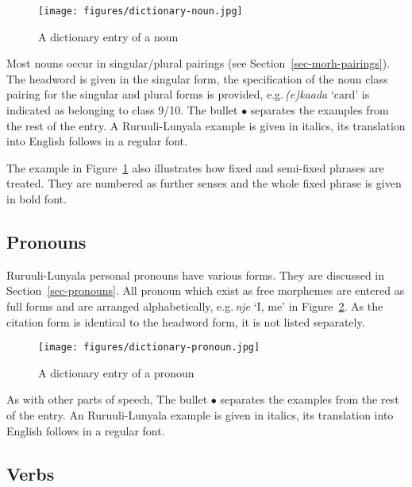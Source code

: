 \begin{figure}[htb]
\begin{center}
 \texttt{[image: figures/dictionary-noun.jpg]}
\caption{A dictionary entry of a noun}\label{fig-nouns}
\end{center}
\end{figure}

\noindent Most nouns occur in singular/plural pairings (see Section~\ref{sec-morh-pairings}). 
The headword is given in the singular form, the specification of the noun class pairing for the singular and plural forms is provided, e.g.\,\emph{(e)kaada} `card' is indicated as belonging to class 9/10. 
The bullet $\bullet$ separates the examples from the rest of the entry. 
A Ru\-ruu\-li\hyp{}Lu\-nya\-la example is given in italics, its translation into English follows in a regular font.

The example in Figure~\ref{fig-nouns} also illustrates how 
fixed and semi-fixed phrases are treated. 
They are numbered as further senses and the whole fixed phrase is given in bold font.


\subsection{Pronouns}
Ruruuli-Lunyala personal pronouns have various forms. 
They are discussed in Section~\ref{sec-pronouns}. 
All pronoun which exist as free morphemes are entered as full forms and are arranged alphabetically, e.g.\,\emph{nje} `I, me' in Figure~\ref{fig-pronoun}. 
As the citation form is identical to the headword form, it is not listed separately.

\begin{figure}[htb]
\begin{center}
 \texttt{[image: figures/dictionary-pronoun.jpg]}
\caption{A dictionary entry of a pronoun}\label{fig-pronoun}
\end{center}
\end{figure}


As with other parts of speech, The bullet $\bullet$ separates the examples from the rest of the entry. An Ru\-ruu\-li\hyp{}Lu\-nya\-la example is given in italics, its translation into English follows in a regular font.


\subsection{Verbs}

